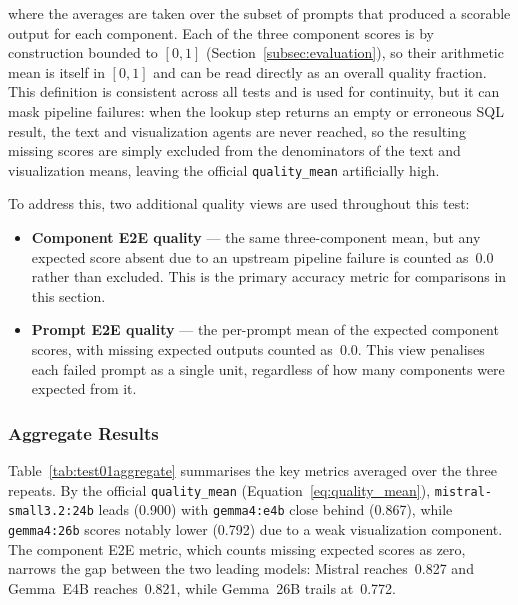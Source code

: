 where the averages are taken over the subset of prompts that produced a
scorable output for each component. Each of the three component scores is by
construction bounded to $[0,1]$ (Section~\ref{subsec:evaluation}), so their
arithmetic mean is itself in $[0,1]$ and can be read directly as an overall
quality fraction. This definition is consistent across
all tests and is used for continuity, but it can mask pipeline failures:
when the lookup step returns an empty or erroneous SQL result, the text
and visualization agents are never reached, so the resulting missing
scores are simply excluded from the denominators of the text and
visualization means, leaving the official \texttt{quality\_mean}
artificially high.

To address this, two additional quality views are used throughout this test:

\begin{itemize}
    \item \textbf{Component E2E quality} — the same three-component mean,
          but any expected score absent due to an upstream pipeline failure
          is counted as~$0.0$ rather than excluded. This is the primary
          accuracy metric for comparisons in this section.
    \item \textbf{Prompt E2E quality} — the per-prompt mean of the expected
          component scores, with missing expected outputs counted as~$0.0$.
          This view penalises each failed prompt as a single unit,
          regardless of how many components were expected from it.
\end{itemize}

\subsubsection{Aggregate Results}

Table~\ref{tab:test01aggregate} summarises the key metrics averaged over the
three repeats. By the official \texttt{quality\_mean} (Equation~\ref{eq:quality_mean}), \texttt{mistral-\allowbreak small3.2:24b} leads (0.900)
with \texttt{gemma4:e4b} close behind (0.867), while \texttt{gemma4:26b}
scores notably lower (0.792) due to a weak visualization component. The
component E2E metric, which counts missing expected scores as zero, narrows
the gap between the two leading models: Mistral reaches~0.827 and Gemma~E4B
reaches~0.821, while Gemma~26B trails at~0.772.

